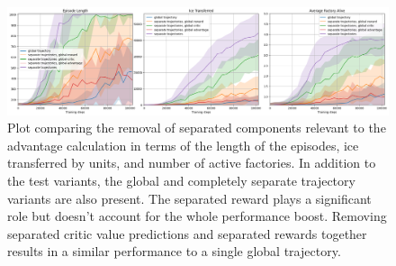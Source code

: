 \begin{figure}[htbp]
    \centering
    \includegraphics[width=0.95\linewidth]{images/results_hybrid/components/combined_rew.png}
    \captionsetup{justification=justified, singlelinecheck=false, width=1\linewidth, labelfont=bf} 
    \caption[]{Plot comparing the removal of separated components relevant to the advantage calculation in terms of the length of the episodes, ice transferred by units, and number of active factories. In addition to the test variants, the global and completely separate trajectory variants are also present. The separated reward plays a significant role but doesn't account for the whole performance boost. Removing separated critic value predictions and separated rewards together results in a similar performance to a single global trajectory.}
    \label{fig:hybrid_results/components/combined_rew}
\end{figure}


